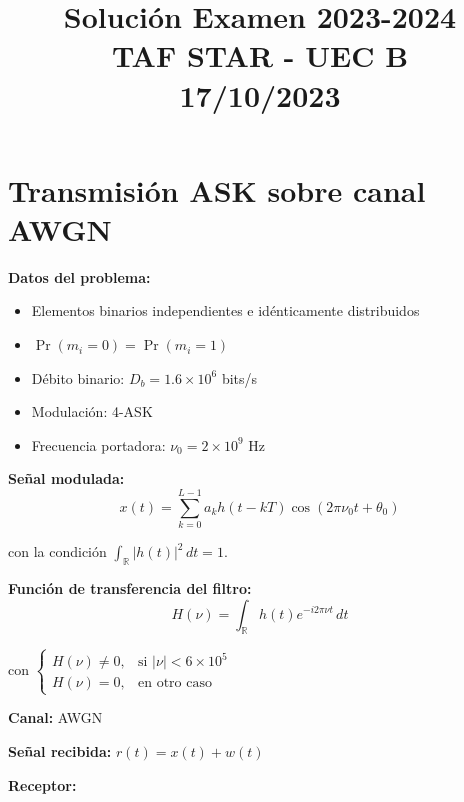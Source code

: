 \documentclass[11pt,a4paper]{article}
\title{\textbf{Soluci\'on Examen 2023-2024\\TAF STAR - UEC B\\17/10/2023}}
\author{}
\date{}
\begin{document}
\maketitle

\section*{Transmisi\'on ASK sobre canal AWGN}

\textbf{Datos del problema:}
\begin{itemize}
    \item Elementos binarios independientes e id\'enticamente distribuidos
    \item $\Pr(m_i = 0) = \Pr(m_i = 1)$
    \item D\'ebito binario: $D_b = 1.6 \times 10^6$ bits/s
    \item Modulaci\'on: 4-ASK
    \item Frecuencia portadora: $\nu_0 = 2 \times 10^9$ Hz
\end{itemize}

\textbf{Se\~nal modulada:}
\[
x(t) = \sum_{k=0}^{L-1} a_k h(t-kT)\cos(2\pi\nu_0 t + \theta_0)
\]

con la condici\'on $\int_{\mathbb{R}} |h(t)|^2\, dt = 1$.

\textbf{Funci\'on de transferencia del filtro:}
\[
H(\nu) = \int_{\mathbb{R}} h(t)e^{-i2\pi\nu t}\, dt
\]

con $\begin{cases}
H(\nu) \neq 0, & \text{si } |\nu| < 6 \times 10^5 \\
H(\nu) = 0, & \text{en otro caso}
\end{cases}$

\textbf{Canal:} AWGN

\textbf{Se\~nal recibida:} $r(t) = x(t) + w(t)$

\textbf{Receptor:}

\begin{center}
\end{center}
\end{document}

